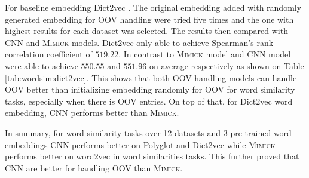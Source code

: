     For baseline embedding Dict2vec \citep{dict2vect2017tissier}. The
    original embedding added with randomly generated embedding for OOV
    handling were tried five times and the one with highest results
    for each dataset was selected. The results then compared with CNN
    and \textsc{Mimick} models. Dict2vec only able to achieve
    Spearman's rank correlation coefficient of $519.22$. In contrast
    to \textsc{Mimick} model and CNN model were able to achieve
    $550.55$ and $551.96$ on average respectively as shown on Table
    \ref{tab:wordsim:dict2vec}. This shows that both OOV handling
    models can handle OOV better than initializing embedding randomly
    for OOV for word similarity tasks, especially when there is OOV
    entries. On top of that, for Dict2vec word embedding, CNN performs
    better than \textsc{Mimick}.

    In summary, for word similarity tasks over 12 datasets and 3
    pre-trained word embeddings CNN performs better on Polyglot and
    Dict2vec while \textsc{Mimick} performs better on word2vec in word
    similarities tasks. This further proved that CNN are better for
    handling OOV than \textsc{Mimick}.